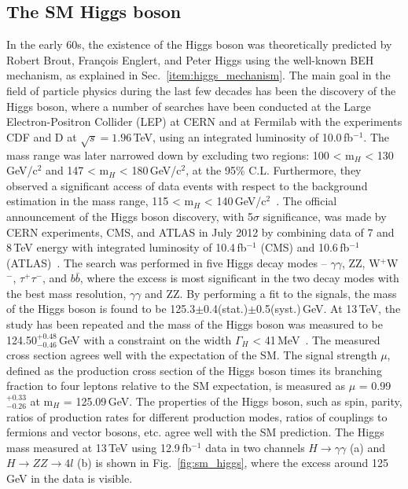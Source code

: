 \subsection{The SM Higgs boson}
In the early 60s, the existence of the Higgs boson was theoretically predicted by Robert Brout, Fran\c cois Englert, and Peter Higgs using the well-known BEH mechanism, as explained in Sec.~\ref{item:higgs_mechanism}. The main goal in the field of particle physics during the last few decades has been the discovery of the Higgs boson, where a number of searches have been conducted at the Large Electron-Positron Collider (LEP) at CERN and at Fermilab with the experiments CDF and D at $\sqrt{s} = 1.96$\,TeV, using an integrated luminosity of 10.0\,fb$^{-1}$. The mass range was later narrowed down by excluding two regions: 100 < m$_{H}$ < 130\,GeV/c$^{2}$ and 147 < m$_{H}$ < 180\,GeV/c$^{2}$, at the 95\% C.L. Furthermore, they observed a significant access of data events with respect to the background estimation in the mass range, 115 < m$_{H}$ < 140\,GeV/c$^{2}$~\cite{sm_higgs_fermilab}. The official announcement of the Higgs boson discovery, with 5$\sigma$ significance, was made by CERN experiments, CMS, and ATLAS in July 2012 by combining data of 7 and 8\,TeV energy with integrated luminosity of 10.4\,fb$^{-1}$ (CMS) and 10.6\,fb$^{-1}$ (ATLAS)~\cite{cms_sm_higgs,atlas_sm_higgs}. The search was performed in five Higgs decay modes – $\gamma\gamma$, ZZ, W$^{+}$W$^{-}$, $\tau^{+}\tau^{-}$, and $b\bar{b}$, where the excess is most significant in the two decay modes with the best mass resolution, $\gamma\gamma$ and ZZ. By performing a fit to the signals, the mass of the Higgs boson is found to be 125.3$\pm$0.4(stat.)$\pm$0.5(syst.)\,GeV. At 13\,TeV, the study has been repeated and the mass of the Higgs boson was measured to be 124.50$^{+0.48}_{-0.46}$\,GeV with a constraint on the width $\Gamma_{H}$ < 41\,MeV~\cite{sm_higgs_13tev}. The measured cross section agrees well with the expectation of the SM. The signal strength $\mu$, defined as the production cross section of the Higgs boson times its branching fraction to four leptons relative to the SM expectation, is measured as $\mu$ = 0.99$^{+0.33}_{-0.26}$ at m$_{H}$ = 125.09\,GeV. The properties of the Higgs boson, such as spin, parity, ratios of production rates for different production modes, ratios of couplings to fermions and vector bosons, etc. agree well with the SM prediction. The Higgs mass measured at 13\,TeV using 12.9\,fb$^{-1}$ data in two channels $H\rightarrow\gamma\gamma$ (a) and $H\rightarrow ZZ\rightarrow 4l$ (b) is shown in Fig.~\ref{fig:sm_higgs}, where the excess around 125\,GeV in the data is visible. 
   
